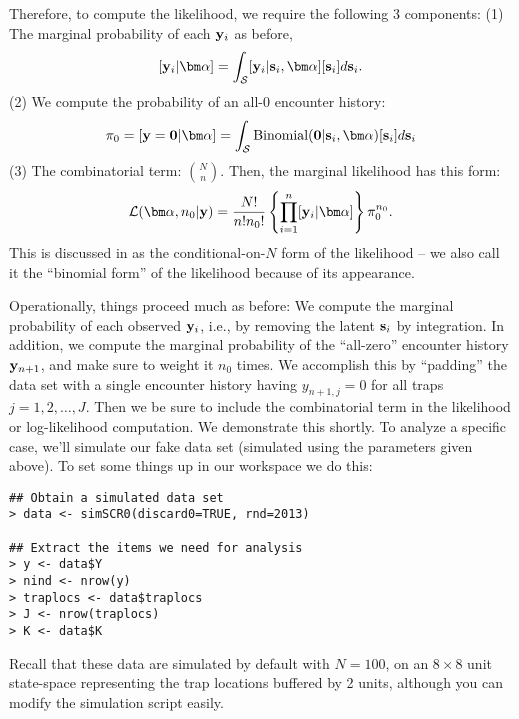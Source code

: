 Therefore, to compute the likelihood, we require 
the following 3 components: (1) The marginal
probability of each ${\bf y}_{i}$ as before,
\[
  [{\bf y}_{i}|{\bm \alpha}] = 
\int_{{\cal S}} [{\bf y}_{i} |{\bf s}_{i}, {\bm
  \alpha}] [{\bf s}_{i}] d{\bf s}_{i}.
\]
(2) We compute
the probability of an all-0 encounter history:
\[
\pi_{0} = [{\bf y} = {\bf 0} | {\bm \alpha}] = 
\int_{{\cal S}} \mbox{Binomial}({\bf 0} |{\bf s}_{i}, {\bm \alpha})[{\bf s}_{i}] d{\bf s}_{i}
\]
(3) The combinatorial term: ${N \choose n}$. Then, 
 the marginal likelihood has this form:
\begin{equation}
 {\cal L}({\bm \alpha}, n_{0}| {\bf y})  = \frac{N!}{n! n_{0}!}
 \left\{ \prod_{i=1}^{n}  [{\bf y}_{i}|{\bm \alpha}] \right\}
\pi_{0}^{n_{0}}.
\label{mle.eq.binomialform}
\end{equation}
This is discussed in \citet[][p. 379]{borchers_efford:2008} as the
conditional-on-$N$ form of the likelihood -- we also call it
the ``binomial form'' of the likelihood because of its appearance. 

Operationally, things proceed much as before: 
We compute the marginal probability of each observed ${\bf y}_{i}$,
i.e., by removing the latent ${\bf s}_{i}$ by integration. In
addition, we 
 compute the marginal probability of the ``all-zero'' encounter
history ${\bf y}_{n+1}$, and make sure to weight it $n_{0}$ times. We
accomplish this by ``padding'' the data set with a single encounter
history having $y_{n+1,j}=0$ for all traps $j=1,2,\ldots,J$. Then we
be sure to include the combinatorial term in the likelihood or
log-likelihood computation. We demonstrate this shortly.
To analyze a specific case, we'll simulate our fake data set (simulated
using the parameters given above). To set some things up in our
workspace we do this:
\begin{verbatim}
## Obtain a simulated data set
> data <- simSCR0(discard0=TRUE, rnd=2013)  

## Extract the items we need for analysis
> y <- data$Y
> nind <- nrow(y)
> traplocs <- data$traplocs
> J <- nrow(traplocs)
> K <- data$K
\end{verbatim}
Recall that these data are simulated by default with $N=100$, on an $8 \times 8$ unit
state-space representing the trap locations  buffered by 2 units,
although you can modify the simulation script easily.

